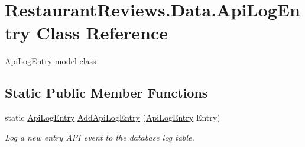 \hypertarget{class_restaurant_reviews_1_1_data_1_1_api_log_entry}{}\section{Restaurant\+Reviews.\+Data.\+Api\+Log\+Entry Class Reference}
\label{class_restaurant_reviews_1_1_data_1_1_api_log_entry}


\hyperlink{class_restaurant_reviews_1_1_data_1_1_api_log_entry}{Api\+Log\+Entry} model class  


\subsection*{Static Public Member Functions}
\begin{DoxyCompactItemize}
\item 
static \hyperlink{class_restaurant_reviews_1_1_data_1_1_api_log_entry}{Api\+Log\+Entry} \hyperlink{class_restaurant_reviews_1_1_data_1_1_api_log_entry_a41175bd1387ab21a15989c4c5cc36f24}{Add\+Api\+Log\+Entry} (\hyperlink{class_restaurant_reviews_1_1_data_1_1_api_log_entry}{Api\+Log\+Entry} Entry)
\begin{DoxyCompactList}\small\item\em Log a new entry A\+PI event to the database log table. \end{DoxyCompactList}\end{DoxyCompactItemize}
